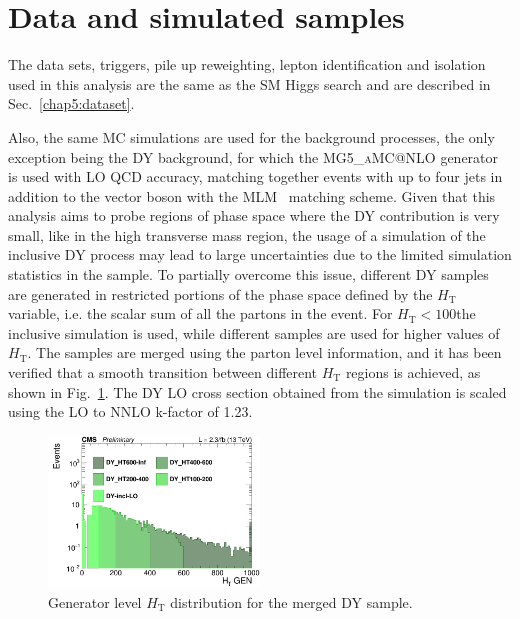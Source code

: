 \section{Data and simulated samples}\label{chap6:datatsets}

The data sets, triggers, pile up reweighting, lepton identification and isolation used in this analysis are the same as the SM Higgs search and are described in Sec.~\ref{chap5:dataset}.

Also, the same MC simulations are used for the background processes, the only exception being the DY background, for which the \textsc{MG5\_aMC@NLO} generator is used with LO QCD accuracy, matching together events with up to four jets in addition to the vector boson with the MLM~\cite{Alwall:2007fs} matching scheme. Given that this analysis aims to probe regions of phase space where the DY contribution is very small, like in the high transverse mass region, the usage of a simulation of the inclusive DY process may lead to large uncertainties due to the limited simulation statistics in the sample. To partially overcome this issue, different DY samples are generated in restricted portions of the phase space defined by the $H_\mathrm{T}$ variable, i.e. the scalar sum of all the partons \pt in the event. For $H_\mathrm{T}< 100$\GeV the inclusive simulation is used, while different samples are used for higher values of $H_\mathrm{T}$. The samples are merged using the parton level information, and it has been verified that a smooth transition between different $H_\mathrm{T}$ regions is achieved, as shown in Fig.~\ref{fig:DY_HT}.
The DY LO cross section obtained from the simulation is scaled using the LO to NNLO k-factor of 1.23.

\begin{figure}[htbp]
\centering
\includegraphics[width=0.5\textwidth]{images/13TeV/log_c_incl_HTGen.png}
\caption{
    Generator level $H_\mathrm{T}$ distribution for the merged DY sample.}
    \label{fig:DY_HT}
\end{figure}

